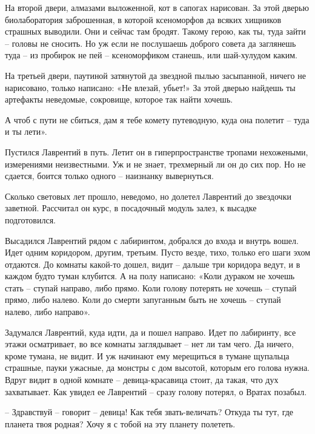 \documentclass[ebook,oneside,final,openright]{memoir}
\begin{document}
На второй двери, алмазами выложенной, кот в сапогах нарисован. За этой дверью биолаборатория заброшенная, в которой ксеноморфов да всяких хищников страшных выводили. Они и сейчас там бродят. Такому герою, как ты, туда зайти – головы не сносить. Но уж если не послушаешь доброго совета да заглянешь туда – из пробирок не пей – ксеноморфиком станешь, или шай-хулудом каким.\par
\par
На третьей двери, паутиной затянутой да звездной пылью засыпанной, ничего не нарисовано, только написано: «Не влезай, убьет!» За этой дверью найдешь ты артефакты неведомые, сокровище, которое так найти хочешь.\par
\par
А чтоб с пути не сбиться, дам я тебе комету путеводную, куда она полетит – туда и ты лети».\par
\par
Пустился Лаврентий в путь. Летит он в гиперпространстве тропами нехожеными, измерениями неизвестными. Уж и не знает, трехмерный ли он до сих пор. Но не сдается, боится только одного – наизнанку вывернуться.\par
\par
Сколько световых лет прошло, неведомо, но долетел Лаврентий до звездочки заветной. Рассчитал он курс, в посадочный модуль залез, к высадке подготовился.\par
\par
Высадился Лаврентий рядом с лабиринтом, добрался до входа и внутрь вошел. Идет одним коридором, другим, третьим. Пусто везде, тихо, только его шаги эхом отдаются. До комнаты какой-то дошел, видит – дальше три коридора ведут, и в каждом будто туман клубится. А на полу написано: «Коли дураком не хочешь стать – ступай направо, либо прямо. Коли голову потерять не хочешь – ступай прямо, либо налево. Коли до смерти запуганным быть не хочешь – ступай налево, либо направо».\par
\par
Задумался Лаврентий, куда идти, да и пошел направо. Идет по лабиринту, все этажи осматривает, во все комнаты заглядывает – нет ли там чего. Да ничего, кроме тумана, не видит. И уж начинают ему мерещиться в тумане щупальца страшные, пауки ужасные, да монстры с дом высотой, которым его голова нужна. Вдруг видит в одной комнате – девица-красавица стоит, да такая, что дух захватывает. Как увидел ее Лаврентий – сразу голову потерял, о Вратах позабыл.\par
\par
– Здравствуй – говорит – девица! Как тебя звать-величать? Откуда ты тут, где планета твоя родная? Хочу я с тобой на эту планету полететь.\par
\end{document}
